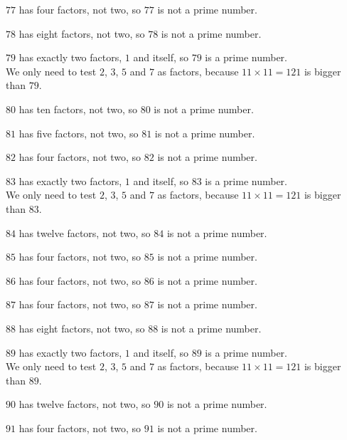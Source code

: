 \documentclass[aspectratio=169]{beamer}
\begin{document}
  {$77$ has four factors, not two, so $77$ is not a prime number.}

  {$78$ has eight factors, not two, so $78$ is not a prime number.}

  {$79$ has exactly two factors, $1$ and itself, so $79$ is a prime number.\\[0.45em]We only need to test $2$, $3$, $5$ and $7$ as factors, because $11\times 11=121$ is bigger than $79$.}

  {$80$ has ten factors, not two, so $80$ is not a prime number.}

  {$81$ has five factors, not two, so $81$ is not a prime number.}

  {$82$ has four factors, not two, so $82$ is not a prime number.}

  {$83$ has exactly two factors, $1$ and itself, so $83$ is a prime number.\\[0.45em]We only need to test $2$, $3$, $5$ and $7$ as factors, because $11\times 11=121$ is bigger than $83$.}

  {$84$ has twelve factors, not two, so $84$ is not a prime number.}

  {$85$ has four factors, not two, so $85$ is not a prime number.}

  {$86$ has four factors, not two, so $86$ is not a prime number.}

  {$87$ has four factors, not two, so $87$ is not a prime number.}

  {$88$ has eight factors, not two, so $88$ is not a prime number.}

  {$89$ has exactly two factors, $1$ and itself, so $89$ is a prime number.\\[0.45em]We only need to test $2$, $3$, $5$ and $7$ as factors, because $11\times 11=121$ is bigger than $89$.}

  {$90$ has twelve factors, not two, so $90$ is not a prime number.}

  {$91$ has four factors, not two, so $91$ is not a prime number.}
\end{document}
